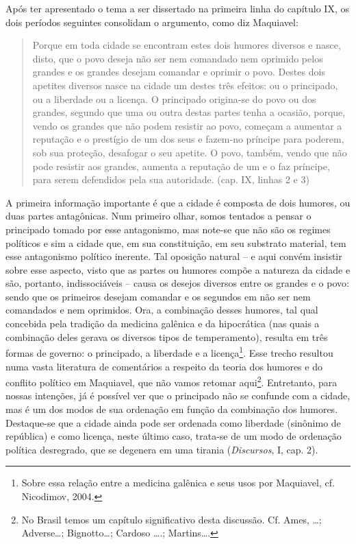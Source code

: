 Após ter apresentado o tema a ser dissertado na primeira linha do
capítulo IX, os dois períodos seguintes consolidam o argumento, como diz
Maquiavel:

\begin{quote}
Porque em toda cidade se encontram estes dois humores diversos e nasce,
disto, que o povo deseja não ser nem comandado nem oprimido pelos
grandes e os grandes desejam comandar e oprimir o povo. Destes dois
apetites diversos nasce na cidade um destes três efeitos: ou o
principado, ou a liberdade ou a licença. O principado origina-se do povo
ou dos grandes, segundo que uma ou outra destas partes tenha a ocasião,
porque, vendo os grandes que não podem resistir ao povo, começam a
aumentar a reputação e o prestígio de um dos seus e fazem-no príncipe
para poderem, sob sua proteção, desafogar o seu apetite. O povo, também,
vendo que não pode resistir aos grandes, aumenta a reputação de um e o
faz príncipe, para serem defendidos pela sua autoridade. (cap. IX,
linhas 2 e 3)
\end{quote}

A primeira informação importante é que a cidade é composta de dois
humores, ou duas partes antagônicas. Num primeiro olhar, somos tentados
a pensar o principado tomado por esse antagonismo, mas note-se que não
são os regimes políticos e sim a cidade que, em sua constituição, em seu
substrato material, tem esse antagonismo político inerente. Tal oposição
natural -- e aqui convém insistir sobre esse aspecto, visto que as
partes ou humores compõe a natureza da cidade e são, portanto,
indissociáveis -- causa os desejos diversos entre os grandes e o povo:
sendo que os primeiros desejam comandar e os segundos em não ser nem
comandados e nem oprimidos. Ora, a combinação desses humores, tal qual
concebida pela tradição da medicina galênica e da hipocrática (nas quais
a combinação deles gerava os diversos tipos de temperamento), resulta em
três formas de governo: o principado, a liberdade e a licença\footnote{Sobre
  essa relação entre a medicina galênica e seus usos por Maquiavel, cf.
  Nicodimov, 2004.}. Esse trecho resultou numa vasta literatura de
comentários a respeito da teoria dos humores e do conflito político em
Maquiavel, que não vamos retomar aqui\footnote{No Brasil temos um
  capítulo significativo desta discussão. Cf. Ames, \ldots{};
  Adverse\ldots{}; Bignotto\ldots{}; Cardoso \ldots{}.; Martins\ldots{}.}.
Entretanto, para nossas intenções, já é possível ver que o principado
não se confunde com a cidade, mas é um dos modos de sua ordenação em
função da combinação dos humores. Destaque-se que a cidade ainda pode
ser ordenada como liberdade (sinônimo de república) e como licença,
neste último caso, trata-se de um modo de ordenação política desregrado,
que se degenera em uma tirania (\emph{Discursos}, I, cap. 2).

